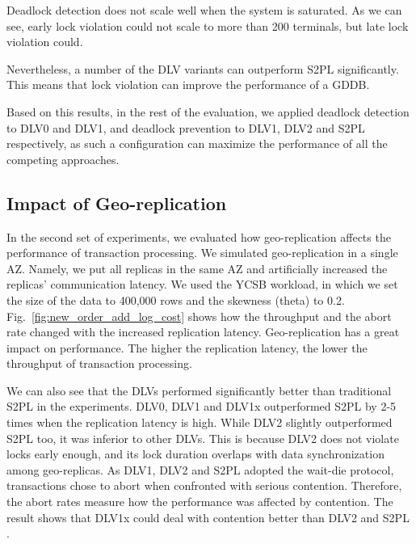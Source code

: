 \documentclass[conference]{IEEEtran}
\begin{document}
Deadlock detection does not scale well when the system is saturated.
As we can see, early lock violation could not scale to more than 200 terminals, but late lock violation could.

Nevertheless, a number of the DLV variants can outperform S2PL significantly. This means that lock violation can improve the performance of a GDDB.

Based on this results, in the rest of the evaluation, we applied deadlock detection to DLV0 and DLV1, and deadlock prevention to DLV1, DLV2 and S2PL respectively,
as such a configuration can maximize the performance of all the competing approaches.


\subsection{Impact of Geo-replication}

In the second set of experiments, we evaluated how geo-replication affects the performance of transaction processing.
We simulated geo-replication in a single AZ.
Namely, we put all replicas in the same AZ and artificially increased the replicas' communication latency.
We used the YCSB workload, in which we set the size of the data to 400,000 rows and the skewness (theta) to 0.2.
Fig.~\ref{fig:new_order_add_log_cost} shows how the throughput and the abort rate changed with the increased replication latency.
Geo-replication has a great impact on performance. The higher the replication latency, the lower the throughput of transaction processing.

We can also see that the DLVs performed significantly better than traditional S2PL in the experiments.
DLV0, DLV1 and DLV1x outperformed S2PL by 2-5 times when the replication latency is high.
While DLV2 slightly outperformed S2PL too, it was inferior to other DLVs.
This is because DLV2 does not violate locks early enough, and its lock duration overlaps with data synchronization among geo-replicas.
As DLV1, DLV2 and S2PL adopted the wait-die protocol, transactions chose to abort when confronted with serious contention.
Therefore, the abort rates measure how the performance was affected by contention.
The result shows that DLV1x could deal with contention better than DLV2 and S2PL .
\end{document}
